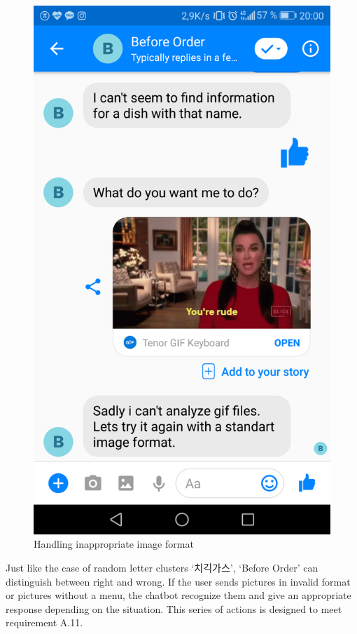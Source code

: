 \begin{figure}[htbp]
\centerline{\includegraphics[height=\custompicheight]{./pictures/Screenshot_20181125-200053}}
\caption{Handling inappropriate image format}
\label{fig:Before Order_handling_error}
\end{figure}
\FloatBarrier

Just like the case of random letter clusters ‘치긱가스’, ‘Before Order’ can distinguish between right and wrong. If the user sends pictures in invalid format or pictures without a menu, the chatbot recognize them and give an appropriate response depending on the situation. This series of actions is designed to meet requirement A.11.


